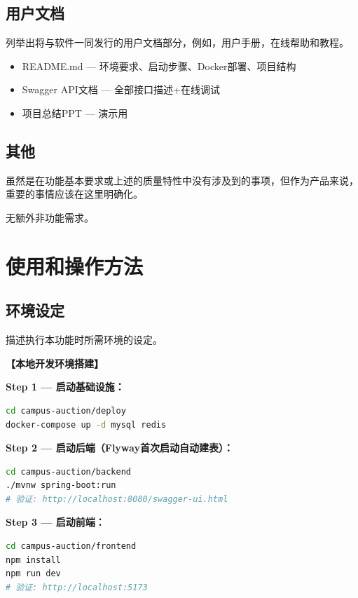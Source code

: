 \documentclass[12pt,a4paper]{ctexart}
\numberwithin{figure}{section}
\numberwithin{table}{section}
\begin{document}
\subsection{用户文档}

列举出将与软件一同发行的用户文档部分，例如，用户手册，在线帮助和教程。

\begin{itemize}
    \item README.md --- 环境要求、启动步骤、Docker部署、项目结构
    \item Swagger API文档 --- 全部接口描述+在线调试
    \item 项目总结PPT --- 演示用
\end{itemize}

\subsection{其他}

虽然是在功能基本要求或上述的质量特性中没有涉及到的事项，但作为产品来说，重要的事情应该在这里明确化。

无额外非功能需求。

\section{使用和操作方法}

\subsection{环境设定}

描述执行本功能时所需环境的设定。

\textbf{【本地开发环境搭建】}

\textbf{Step 1 --- 启动基础设施：}

\begin{lstlisting}[language=bash]
cd campus-auction/deploy
docker-compose up -d mysql redis
\end{lstlisting}

\textbf{Step 2 --- 启动后端（Flyway首次启动自动建表）：}

\begin{lstlisting}[language=bash]
cd campus-auction/backend
./mvnw spring-boot:run
# 验证: http://localhost:8080/swagger-ui.html
\end{lstlisting}

\textbf{Step 3 --- 启动前端：}

\begin{lstlisting}[language=bash]
cd campus-auction/frontend
npm install
npm run dev
# 验证: http://localhost:5173
\end{lstlisting}
\end{document}
